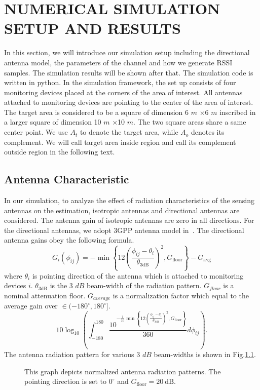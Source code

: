 \chapter{NUMERICAL SIMULATION SETUP AND RESULTS}
In this section, we will introduce our simulation setup including the directional antenna model, the parameters of the channel and how we generate RSSI samples. The simulation results will be shown after that. The simulation code is written in python. In the simulation framework, the set up consists of four monitoring devices placed
at the corners of the area of interest. All antennas attached to monitoring devices are pointing to the center of the area of interest. The target area is considered to be a square of dimension 6 $m$ ×6 $m$ inscribed in a larger square of dimension 10 $m$ ×10 $m$. The two square areas share a same center point. We use $A_{t}$ to denote the target area, while $A_{o}$ denotes its complement. We will call target area inside region and call its complement outside region in the following text.

\section{Antenna Characteristic}
In our simulation, to analyze the effect of radiation characteristics of the sensing antennas on the estimation, isotropic antennas and directional antennas are considered. The antenna gain of isotropic antennas are zero in all directions. For the directional antennas, we adopt 3GPP antenna model in~\cite{3GPP-antenna}. The directional antenna gains obey the following formula.
\begin{equation*}
G_i (\phi_{ij}) = - \min \left\{
12 \left( \frac{\phi_{ij} - \theta_{i}}{\theta_{\mathrm{3dB}}} \right)^2,
G_{\mathrm{floor}} \right\} - G_{\mathrm{avg}}
\end{equation*}
where $\theta_{i}$ is pointing direction of the antenna which is attached to monitoring devices $i$. $\theta_{\mathrm{3dB}}$ is the 3 $dB$ beam-width of the radiation pattern. $G_{floor}$ is a nominal attenuation floor. $G_{average}$ is a normalization factor which equal to the average gain over $\in (-180^{\circ}, 180^{\circ}]$.
\begin{equation*}
10 \log_{10} \left( \int_{-180}^{180}
\frac{ 10^{ - \frac{1}{10} \min \left\{
		12 \left( \frac{\phi_{ij} - \theta_{i}}{\theta_{\mathrm{3dB}}} \right)^2,
		G_{\mathrm{floor}} \right\} } }{360} d \phi_{ij} \right) .
\end{equation*}
The antenna radiation pattern for various 3 $dB$ beam-widths is shown in Fig.\ref{figure:AntennaCandidates}.
\begin{figure}[t]
	\centerline{}
	\caption{This graph depicts normalized antenna radiation patterns. The pointing direction is set to $ 0^{\circ}$ and $G_{\mathrm{floor}} = 20~\mathrm{dB}$.}
	\label{figure:AntennaCandidates}
\end{figure}

